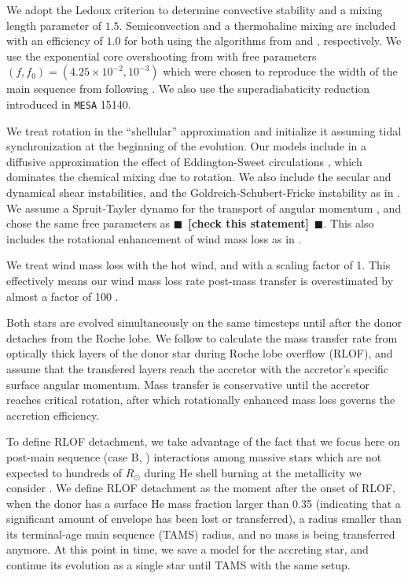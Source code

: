 \documentclass[twocolumn,twocolappendix,trackchanges]{aastex63}
\newcommand{\todo}[1]{{\large $\blacksquare$~\textbf{\color{red}[#1]}}~$\blacksquare$}
\begin{document}
We adopt the Ledoux criterion to determine convective stability and a
mixing length parameter of $1.5$. Semiconvection and a thermohaline
mixing are included with an efficiency of $1.0$ for both using the
algorithms from \cite{langer:83} and \cite{kippenhahn:80},
respectively. We use the exponential core overshooting from
\cite{herwig:00} with free parameters
$(f, f_0)=(4.25\times10^{-2}, 10^{-3})$ which were chosen to reproduce
the width of the main sequence from \cite{brott:11} following
\cite{claret:17}. We also use the superadiabaticity reduction
introduced in \texttt{MESA} 15140.

We treat rotation in the ``shellular'' approximation and initialize it
assuming tidal synchronization at the
beginning of the evolution. Our models include in a diffusive
approximation the effect of Eddington-Sweet circulations
\citep{sweet:50}, which dominates the chemical mixing due to
rotation. We also include the secular and dynamical shear
instabilities, and the Goldreich-Schubert-Fricke instability as in
\cite{gotberg:17, gotberg:18, laplace:20, laplace:21}.  We assume a Spruit-Tayler
dynamo for the transport of angular momentum \citep{spruit:02}, and chose the same free
parameters as \cite{heger:00} \todo{check this statement}. This also includes the rotational
enhancement of wind mass loss as in \cite{langer:98}.

We treat wind mass loss with the \cite{vink:00,vink:01} hot wind,
and \cite{dejager:88} with a scaling factor of 1. This effectively
means our wind mass loss rate post-mass transfer is overestimated by
almost a factor of 100 \citep[weak wind problem, see][]{marcolino:09}.


Both stars are evolved simultaneously on the same timesteps until
after the donor detaches from the Roche lobe. We follow \cite{kolb:90}
to calculate the mass transfer rate from optically thick layers of the
donor star during Roche lobe overflow (RLOF), and assume that the transfered layers reach
the accretor with the accretor's specific surface angular
momentum. Mass transfer is conservative until the accretor reaches
critical rotation, after which rotationally enhanced mass loss governs
the accretion efficiency.

To define RLOF detachment, we take advantage of the fact that we focus
here on post-main sequence (case B, \citealt{kippenhahn:67})
interactions among massive stars which are not expected to hundreds of
$R_\odot$ during He shell burning at the metallicity we consider \citep[e.g.,][]{laplace:20}.  We
define RLOF detachment as the moment after the onset of RLOF, when the
donor has a surface He mass fraction larger than 0.35 (indicating that
a significant amount of envelope has been lost or transferred), a
radius smaller than its terminal-age main sequence (TAMS) radius, and
no mass is being transferred anymore. At this point in time, we save a
model for the accreting star, and continue its evolution as a single
star until TAMS with the same setup.
\end{document}
